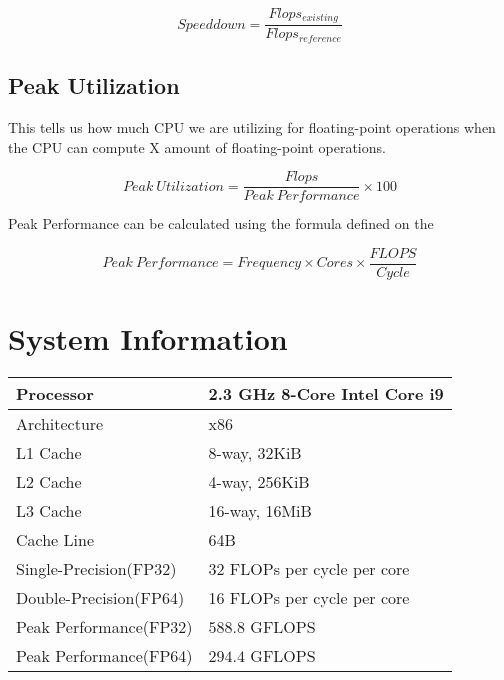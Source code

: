 \begin{equation}
    Speeddown = \frac{Flops_{existing}}{Flops_{reference}}
    \label{eqspeeddown}
\end{equation}

\subsection{Peak Utilization}

This tells us how much CPU we are utilizing for floating-point operations when 
the CPU can compute X amount of floating-point operations.

\begin{equation}
    Peak\ Utilization = \frac{Flops}{Peak\ Performance} \times 100
    \label{eqpeak_util}
\end{equation}

Peak Performance can be calculated using the formula defined on the \citep{wiki:FLOPS}

\begin{equation}
    Peak\ Performance = Frequency \times Cores \times \frac{FLOPS}{Cycle}
\end{equation}

\clearpage
\section{System Information}
\begin{table}[htb]
    \centering
    \begin{tabular}{|l | l|}
        \hline
        Processor & 2.3 GHz 8-Core Intel Core i9 \\
        \hline
        Architecture & x86 \\
        \hline
        L1 Cache & 8-way, 32KiB \\
        \hline
        L2 Cache & 4-way, 256KiB \\
        \hline
        L3 Cache & 16-way, 16MiB \\
        \hline
        Cache Line & 64B \\
        \hline
        Single-Precision(FP32) & 32 FLOPs per cycle per core \\
        \hline
        Double-Precision(FP64) & 16 FLOPs per cycle per core\\
        \hline
        Peak Performance(FP32) & $588.8$ GFLOPS\\
        \hline
        Peak Performance(FP64) & $294.4$ GFLOPS\\
        \hline
    \end{tabular}
\end{table}


